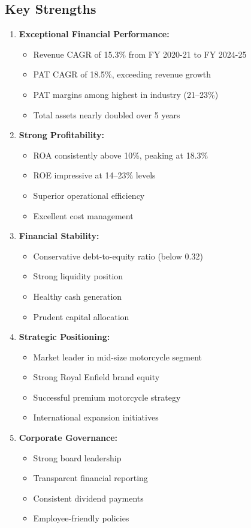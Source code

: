 \documentclass[8pt,a4paper]{article}
\begin{document}
\subsection{Key Strengths}

\begin{enumerate}
    \item \textbf{Exceptional Financial Performance:}
    \begin{itemize}
        \item Revenue CAGR of 15.3\% from FY 2020-21 to FY 2024-25
        \item PAT CAGR of 18.5\%, exceeding revenue growth
        \item PAT margins among highest in industry (21--23\%)
        \item Total assets nearly doubled over 5 years
    \end{itemize}
    
    \item \textbf{Strong Profitability:}
    \begin{itemize}
        \item ROA consistently above 10\%, peaking at 18.3\%
        \item ROE impressive at 14--23\% levels
        \item Superior operational efficiency
        \item Excellent cost management
    \end{itemize}
    
    \item \textbf{Financial Stability:}
    \begin{itemize}
        \item Conservative debt-to-equity ratio (below 0.32)
        \item Strong liquidity position
        \item Healthy cash generation
        \item Prudent capital allocation
    \end{itemize}
    
    \item \textbf{Strategic Positioning:}
    \begin{itemize}
        \item Market leader in mid-size motorcycle segment
        \item Strong Royal Enfield brand equity
        \item Successful premium motorcycle strategy
        \item International expansion initiatives
    \end{itemize}
    
    \item \textbf{Corporate Governance:}
    \begin{itemize}
        \item Strong board leadership
        \item Transparent financial reporting
        \item Consistent dividend payments
        \item Employee-friendly policies
    \end{itemize}
\end{enumerate}
\end{document}
